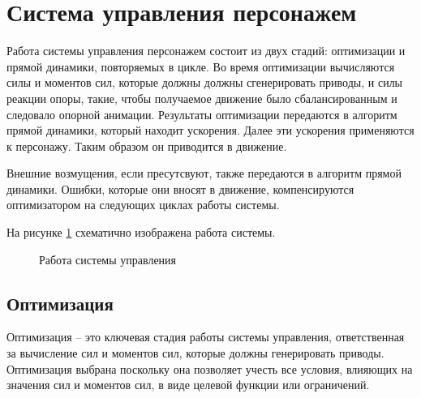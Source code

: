 \section{Система управления персонажем}

Работа системы управления персонажем состоит из двух стадий: оптимизации и прямой динамики, повторяемых в цикле. Во время оптимизации вычисляются силы и моментов сил, которые должны должны сгенерировать приводы, и силы реакции опоры, такие, чтобы получаемое движение было сбалансированным и следовало опорной анимации. Результаты оптимизации передаются в алгоритм прямой динамики, который находит ускорения. Далее эти ускорения применяются к персонажу. Таким образом он приводится в движение.

Внешние возмущения, если пресутсвуют, также передаются в алгоритм прямой динамики. Ошибки, которые они вносят в движение, компенсируются оптимизатором на следующих циклах работы системы.

На рисунке \ref{fig:architecture} схематично изображена работа системы.

\begin{figure}[ht]
  \begin{minipage}{\textwidth}
    \centering
    \caption{Работа системы управления}
    \label{fig:architecture}
  \end{minipage}
\end{figure}

\subsection{Оптимизация}

Оптимизация -- это ключевая стадия работы системы управления, ответственная за вычисление сил и моментов сил, которые должны генерировать приводы. Оптимизация выбрана поскольку она позволяет учесть все условия, влияющих на значения сил и моментов сил, в виде целевой функции или ограничений.

